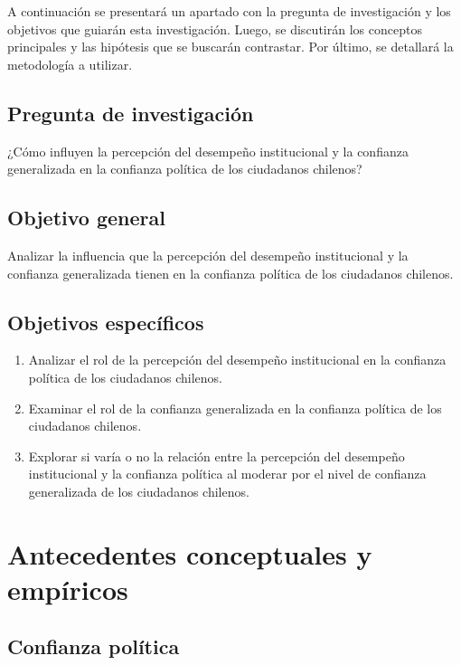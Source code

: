 \documentclass[12pt,twoside]{templates/facsothesis}
\providecommand{\tightlist}{%
  \setlength{\itemsep}{0pt}\setlength{\parskip}{0pt}}
\begin{document}
A continuación se presentará un apartado con la pregunta de investigación y los objetivos que guiarán esta investigación. Luego, se discutirán los conceptos principales y las hipótesis que se buscarán contrastar. Por último, se detallará la metodología a utilizar.

\section{Pregunta de investigación}\label{pregunta-de-investigaciuxf3n}

¿Cómo influyen la percepción del desempeño institucional y la confianza generalizada en la confianza política de los ciudadanos chilenos?

\section{Objetivo general}\label{objetivo-general}

Analizar la influencia que la percepción del desempeño institucional y la confianza generalizada tienen en la confianza política de los ciudadanos chilenos.

\section{Objetivos específicos}\label{objetivos-especuxedficos}

\begin{enumerate}
\def\labelenumi{\arabic{enumi}.}
\tightlist
\item
  Analizar el rol de la percepción del desempeño institucional en la confianza política de los ciudadanos chilenos.
\item
  Examinar el rol de la confianza generalizada en la confianza política de los ciudadanos chilenos.
\item
  Explorar si varía o no la relación entre la percepción del desempeño institucional y la confianza política al moderar por el nivel de confianza generalizada de los ciudadanos chilenos.
\end{enumerate}

\chapter{Antecedentes conceptuales y empíricos}\label{antecedentes-conceptuales-y-empuxedricos}

\section{Confianza política}\label{confianza-poluxedtica}
\end{document}
